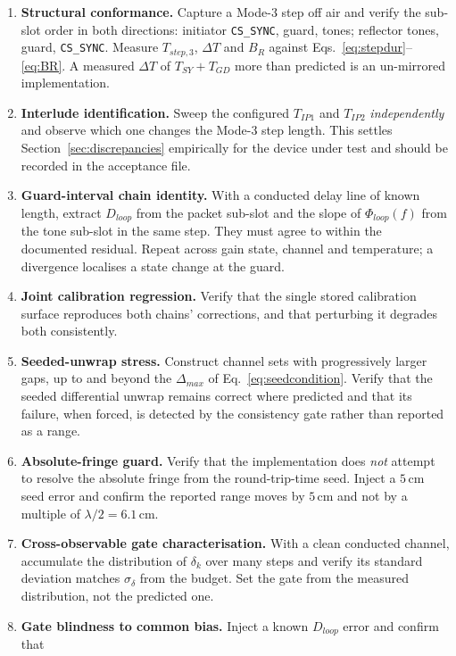 \documentclass[11pt,a4paper]{article}
\newcommand{\Tsy}{T_{SY}}
\newcommand{\Tgd}{T_{GD}}
\newcommand{\code}[1]{\texttt{\small #1}}
\begin{document}
\begin{enumerate}[leftmargin=1.7em,itemsep=2pt]
  \item \textbf{Structural conformance.} Capture a Mode-3 step off air and verify the sub-slot order
    in both directions: initiator \code{CS\_SYNC}, guard, tones; reflector tones, guard,
    \code{CS\_SYNC}. Measure $T_{step,3}$, $\Delta T$ and $B_R$ against
    Eqs.~\eqref{eq:stepdur}--\eqref{eq:BR}. A measured $\Delta T$ of $\Tsy+\Tgd$ more than predicted
    is an un-mirrored implementation.
  \item \textbf{Interlude identification.} Sweep the configured $T_{IP1}$ and $T_{IP2}$
    \emph{independently} and observe which one changes the Mode-3 step length. This settles
    Section~\ref{sec:discrepancies} empirically for the device under test and should be recorded in
    the acceptance file.
  \item \textbf{Guard-interval chain identity.} With a conducted delay line of known length, extract
    $D_{loop}$ from the packet sub-slot and the slope of $\Phi_{loop}(f)$ from the tone sub-slot in
    the same step. They must agree to within the documented residual. Repeat across gain state,
    channel and temperature; a divergence localises a state change at the guard.
  \item \textbf{Joint calibration regression.} Verify that the single stored calibration surface
    reproduces both chains' corrections, and that perturbing it degrades both consistently.
  \item \textbf{Seeded-unwrap stress.} Construct channel sets with progressively larger gaps, up to
    and beyond the $\Delta_{max}$ of Eq.~\eqref{eq:seedcondition}. Verify that the seeded differential
    unwrap remains correct where predicted and that its failure, when forced, is detected by the
    consistency gate rather than reported as a range.
  \item \textbf{Absolute-fringe guard.} Verify that the implementation does \emph{not} attempt to
    resolve the absolute fringe from the round-trip-time seed. Inject a $5$\,cm seed error and confirm
    the reported range moves by $5$\,cm and not by a multiple of $\lambda/2 = 6.1$\,cm.
  \item \textbf{Cross-observable gate characterisation.} With a clean conducted channel, accumulate
    the distribution of $\delta_k$ over many steps and verify its standard deviation matches
    $\sigma_\delta$ from the budget. Set the gate from the measured distribution, not the predicted
    one.
  \item \textbf{Gate blindness to common bias.} Inject a known $D_{loop}$ error and confirm that

\end{enumerate}
\end{document}
